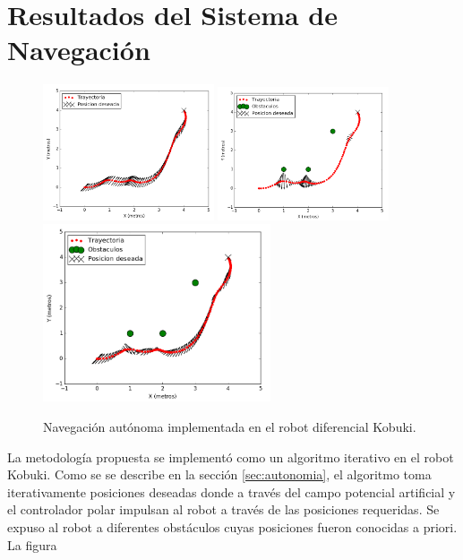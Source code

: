 \section{Resultados del Sistema de Navegación}
\begin{figure}%
  \centering \footnotesize
  \includegraphics[width=0.45\textwidth]{images/attr_kbki.png}
  \includegraphics[width=0.45\textwidth]{images/rep_kbki.png}
  \includegraphics[width=0.60\textwidth]{images/nav_kbki.png}
  \captionsetup{font=footnotesize}
  \caption{Navegación autónoma implementada en el robot diferencial Kobuki.}
  \label{f:kbki_APF}
\end{figure}
La metodología propuesta se implementó como un algoritmo iterativo en el robot Kobuki. 
Como se se describe en la sección \ref{sec:autonomia}, el algoritmo toma iterativamente 
posiciones deseadas  donde a través del campo potencial artificial y el controlador 
polar impulsan al robot a través de las posiciones requeridas. Se expuso al robot 
a diferentes obstáculos cuyas posiciones fueron conocidas a priori. La figura 
